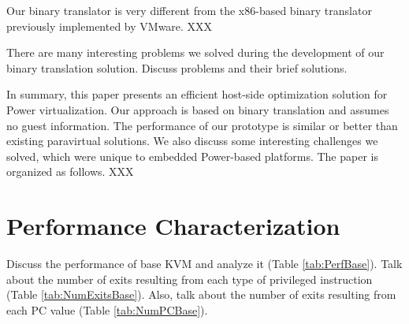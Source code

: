 \documentclass[10pt,twocolumn]{article}
\begin{document}
Our binary translator is very different from the x86-based binary translator
previously implemented by VMware. XXX

There are many interesting problems we solved during the development of our
binary translation solution. Discuss problems and their brief solutions.

In summary, this paper presents an efficient host-side optimization solution for
Power virtualization. Our approach is based on binary translation and assumes no
guest information. The performance of our prototype is similar or better than
existing paravirtual solutions. We also discuss some interesting challenges we solved,
which were unique to embedded Power-based platforms. The paper is organized as
follows. XXX

\section{Performance Characterization}
Discuss the performance of base KVM and analyze it (Table \ref{tab:PerfBase}). Talk about the number of exits
resulting from each type of privileged instruction (Table \ref{tab:NumExitsBase}). Also, talk about the number
of exits resulting from each PC value (Table \ref{tab:NumPCBase}).
\end{document}
